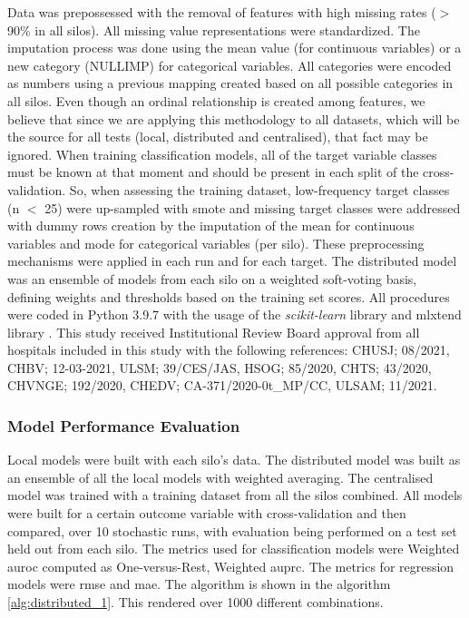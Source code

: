 Data was prepossessed with the removal of features with high missing rates ($>$ 90\% in all silos). All missing value representations were standardized. The imputation process was done using the mean value (for continuous variables) or a new category (NULLIMP) for categorical variables. All categories were encoded as numbers using a previous mapping created based on all possible categories in all silos. Even though an ordinal relationship is created among features, we believe that since we are applying this methodology to all datasets, which will be the source for all tests (local, distributed and centralised), that fact may be ignored.
When training classification models, all of the target variable classes must be known at that moment and should be present in each split of the cross-validation. So, when assessing the training dataset, low-frequency target classes (n $<$ 25) were up-sampled with \ac{smote} \cite{smote} and missing target classes were addressed with dummy rows creation by the imputation of the mean for continuous variables and mode for categorical variables (per silo). These preprocessing mechanisms were applied in each run and for each target.
The distributed model was an ensemble of models from each silo on a weighted soft-voting basis, defining weights and thresholds based on the training set scores. 
All procedures were coded in Python 3.9.7 with the usage of the \textit{scikit-learn} library \cite{scikit-learn} and mlxtend library \cite{mlxtend}.
This study received Institutional Review Board approval from all hospitals included in this study with the following references: CHUSJ; 08/2021, CHBV; 12-03-2021, ULSM; 39/CES/JAS, HSOG; 85/2020, CHTS; 43/2020, CHVNGE; 192/2020,
CHEDV; CA-371/2020-0t\_MP/CC, ULSAM; 11/2021.


\subsubsection{Model Performance Evaluation}

Local models were built with each silo's data. The distributed model was built as an ensemble of all the local models with weighted averaging. The centralised model was trained with a training dataset from all the silos combined. 
All models were built for a certain outcome variable with cross-validation and then compared, over 10 stochastic runs, with evaluation being performed on a test set held out from each silo. The metrics used for classification models were Weighted \ac{auroc} computed as One-versus-Rest, Weighted \ac{auprc}. The metrics for regression models were \ac{rmse} and \ac{mae}. The algorithm is shown in the algorithm \ref{alg:distributed_1}. This rendered over 1000 different combinations.


